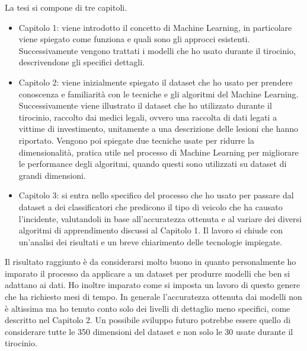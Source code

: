\documentclass[12pt]{article}
\begin{document}
La tesi si compone di tre capitoli.
\begin{itemize}
	\item Capitolo 1: viene introdotto il concetto di Machine Learning, in particolare viene spiegato come funziona e quali sono gli approcci esistenti. Successivamente vengono trattati i modelli che ho usato durante il tirocinio, descrivendone gli specifici dettagli.
	\item Capitolo 2: viene inizialmente spiegato il dataset che ho usato per prendere conoscenza e familiarità con le tecniche e gli algoritmi del Machine Learning. Successivamente viene illustrato il dataset che ho utilizzato durante il tirocinio, raccolto dai medici legali, ovvero una raccolta di dati legati a vittime di investimento, unitamente a una descrizione delle lesioni che hanno riportato. Vengono poi spiegate due tecniche usate per ridurre la dimensionalità, pratica utile nel processo di Machine Learning per migliorare le performance degli algoritmi, quando questi sono utilizzati su dataset di grandi dimensioni.
	\item Capitolo 3: si entra nello specifico del processo che ho usato per passare dal dataset a dei classificatori che predicono il tipo di veicolo che ha causato l'incidente, valutandoli in base all'accuratezza ottenuta e al variare dei diversi algoritmi di apprendimento discussi al Capitolo 1. Il lavoro si chiude con un'analisi dei risultati e un breve chiarimento delle tecnologie impiegate.
\end{itemize}
Il risultato raggiunto è da considerarsi molto buono in quanto personalmente ho imparato il processo da applicare a un dataset per produrre modelli che ben si adattano ai dati. Ho inoltre imparato come si imposta un lavoro di questo genere che ha richiesto mesi di tempo. In generale l'accuratezza ottenuta dai modelli non è altissima ma ho tenuto conto solo dei livelli di dettaglio meno specifici, come descritto nel Capitolo 2. Un possibile sviluppo futuro potrebbe essere quello di considerare tutte le 350 dimensioni del dataset e non solo le 30 usate durante il tirocinio.
\end{document}
